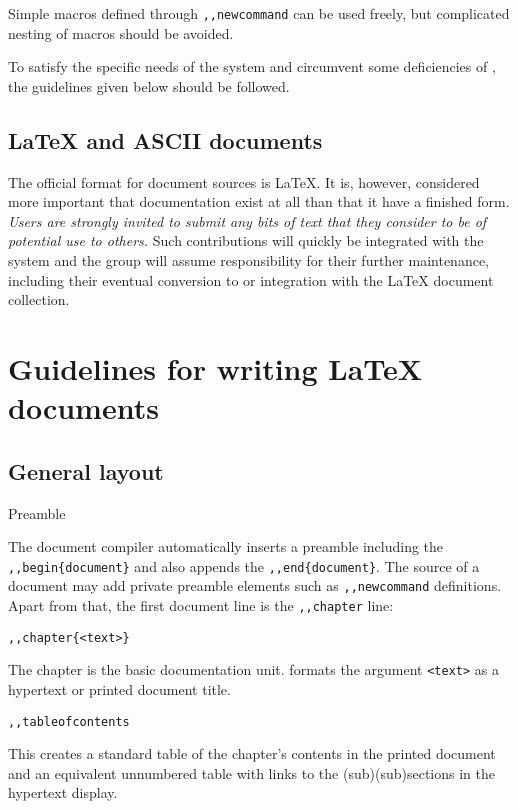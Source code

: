         Simple macros defined through 
\verb/,,newcommand/ can be used freely, but complicated nesting of macros
should be avoided. 

        To satisfy the specific needs of the \NEWSTAR system and circumvent
some deficiencies of \ltoh, the guidelines given below should be followed. 


\subsection{ LaTeX and ASCII documents} 

        The official format for \NEWSTAR document sources is LaTeX. It is,
however, considered more important that documentation exist at all than that it
have a finished form. {\em Users are strongly invited to submit any bits of
text that they consider to be of potential use to others.} Such contributions
will quickly be integrated with the system and the \NEWSTAR group will assume
responsibility for their further maintenance, including their eventual
conversion to or integration with the LaTeX document collection. 


\section{ Guidelines for writing LaTeX documents} 

\subsection{ General layout} 
\label{.layout} 

\bi 
\item   Preamble 

        The document compiler \ndoc automatically inserts a preamble including
the \verb/,,begin{document}/ and also appends the \verb/,,end{document}/. The
source of a document may add private preamble elements such as 
\verb/,,newcommand/ definitions. Apart from that, the first document line is
the 
\verb/,,chapter/ line: 

\item \verb/,,chapter{<text>}/ 

        The chapter is the basic documentation unit. \ndoc formats the argument 
\verb/<text>/ as a hypertext or printed document title. 


\item \verb/,,tableofcontents/ 

        This creates a standard table of the chapter's contents in the printed
document and an equivalent unnumbered table with links to the
(sub)(sub)sections in the hypertext display. 


